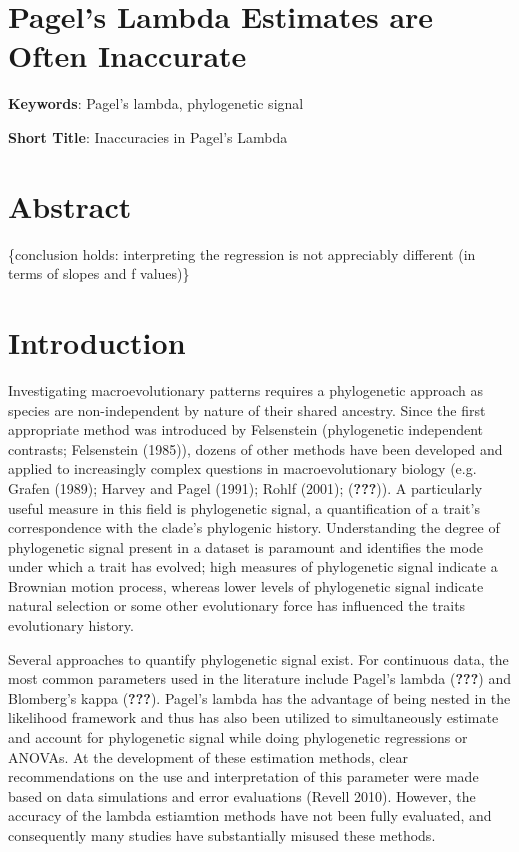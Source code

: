 \documentclass[]{article}
\date{}
\begin{document}
\section{Pagel's Lambda Estimates are Often
Inaccurate}\label{pagels-lambda-estimates-are-often-inaccurate}

\hfill\break

\textbf{Keywords}: Pagel's lambda, phylogenetic signal \hfill\break

\textbf{Short Title}: Inaccuracies in Pagel's Lambda \hfill\break

\section{Abstract}\label{abstract}

\{conclusion holds: interpreting the regression is not appreciably
different (in terms of slopes and f values)\}

\newpage

\section{Introduction}\label{introduction}

Investigating macroevolutionary patterns requires a phylogenetic
approach as species are non-independent by nature of their shared
ancestry. Since the first appropriate method was introduced by
Felsenstein (phylogenetic independent contrasts; Felsenstein (1985)),
dozens of other methods have been developed and applied to increasingly
complex questions in macroevolutionary biology (e.g. Grafen (1989);
Harvey and Pagel (1991); Rohlf (2001); ({\textbf{???}})). A particularly
useful measure in this field is phylogenetic signal, a quantification of
a trait's correspondence with the clade's phylogenic history.
Understanding the degree of phylogenetic signal present in a dataset is
paramount and identifies the mode under which a trait has evolved; high
measures of phylogenetic signal indicate a Brownian motion process,
whereas lower levels of phylogenetic signal indicate natural selection
or some other evolutionary force has influenced the traits evolutionary
history. \hfill\break

Several approaches to quantify phylogenetic signal exist. For continuous
data, the most common parameters used in the literature include Pagel's
lambda ({\textbf{???}}) and Blomberg's kappa ({\textbf{???}}). Pagel's
lambda has the advantage of being nested in the likelihood framework and
thus has also been utilized to simultaneously estimate and account for
phylogenetic signal while doing phylogenetic regressions or ANOVAs. At
the development of these estimation methods, clear recommendations on
the use and interpretation of this parameter were made based on data
simulations and error evaluations (Revell 2010). However, the accuracy
of the lambda estiamtion methods have not been fully evaluated, and
consequently many studies have substantially misused these methods.
\hfill\break
\end{document}
